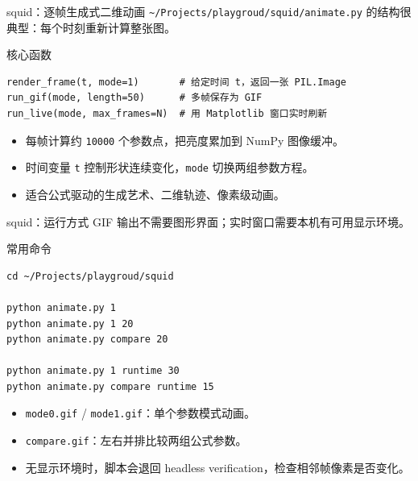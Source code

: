 \documentclass[aspectratio=169,11pt]{ctexbeamer}
\begin{document}
\begin{frame}[fragile]{squid：逐帧生成式二维动画}
  \texttt{\textasciitilde/Projects/playgroud/squid/animate.py} 的结构很典型：每个时刻重新计算整张图。

  \begin{block}{核心函数}
\begin{Verbatim}[fontsize=\small]
render_frame(t, mode=1)       # 给定时间 t，返回一张 PIL.Image
run_gif(mode, length=50)      # 多帧保存为 GIF
run_live(mode, max_frames=N)  # 用 Matplotlib 窗口实时刷新
\end{Verbatim}
  \end{block}

  \begin{itemize}
    \item 每帧计算约 \texttt{10000} 个参数点，把亮度累加到 NumPy 图像缓冲。
    \item 时间变量 \texttt{t} 控制形状连续变化，\texttt{mode} 切换两组参数方程。
    \item 适合公式驱动的生成艺术、二维轨迹、像素级动画。
  \end{itemize}
\end{frame}

\begin{frame}[fragile]{squid：运行方式}
  GIF 输出不需要图形界面；实时窗口需要本机有可用显示环境。

  \begin{block}{常用命令}
\begin{Verbatim}[fontsize=\small]
cd ~/Projects/playgroud/squid

python animate.py 1
python animate.py 1 20
python animate.py compare 20

python animate.py 1 runtime 30
python animate.py compare runtime 15
\end{Verbatim}
  \end{block}

  \begin{itemize}
    \item \texttt{mode0.gif} / \texttt{mode1.gif}：单个参数模式动画。
    \item \texttt{compare.gif}：左右并排比较两组公式参数。
    \item 无显示环境时，脚本会退回 headless verification，检查相邻帧像素是否变化。
  \end{itemize}
\end{frame}
\end{document}
